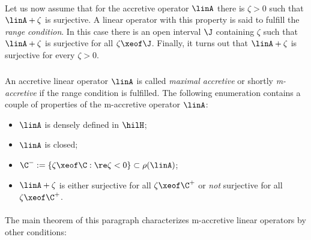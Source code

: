 \documentclass[11pt,twoside]{article}
\begin{document}
\paragraph{} %
Let us now assume that
for the accretive operator $\linA$
there is $\zeta > 0$
such that $\linA + \zeta$ is surjective.
A linear operator with this property is said
to fulfill the \textit{range condition}.
In this case there is an open interval $\J$ containing $\zeta$
such that $\linA + \zeta$ is surjective for all $\zeta \xeof \J$.
Finally,
it turns out that
$\linA + \zeta$ is surjective for every $\zeta > 0$.

\subparagraph{}
An accretive linear operator $\linA$ is called \textit{maximal accretive}
or shortly \textit{m-accretive}
if the range condition is fulfilled.
The following enumeration contains a couple of properties
of the m-accretive operator $\linA$:

\begin{itemize}[leftmargin=12mm]
\item[(a)] $\linA$ is densely defined in $\hilH$;
\item[(b)] $\linA$ is closed;
\item[(c)] $\C^- := \{\zeta \xeof \C: \re \zeta < 0\} \subset \rho(\linA)$;
\item[(d)] $\linA + \zeta$ is either surjective for all $\zeta \xeof \C^+$
          or \textit{not} surjective for all $\zeta \xeof \C^+$.
\end{itemize}

\paragraph{} %
The main theorem of this paragraph
characterizes m-accretive linear operators by other conditions:
\end{document}
